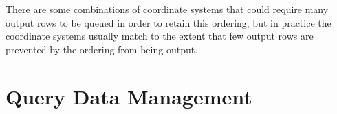 \documentclass{ucdthesis}       %
\newcommand{\func}[2]{\CALL{#1}{#2}}
\newcommand{\meth}{\negthickspace \rightarrow \negthickspace}
\newcommand{\METH}[2]{\meth\CALL{#1}{#2}}
\begin{document}
There are some combinations of coordinate systems that could require
many output rows to be queued in order to retain this ordering, but in
practice the coordinate systems usually match to the extent that few
output rows are prevented by the ordering from being output.  




\section{Query Data Management}
\label{sec:query-data}
\end{document}
